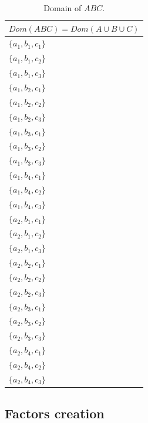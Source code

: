 \begin{table}[]
\centering
\begin{tabular}{|l|}
      $Dom(ABC) = Dom(A \cup B \cup C )$  \\
      \hline
$\lbrace a_1, b_1, c_1  \rbrace$ \\ \hline
$\lbrace a_1, b_1, c_2  \rbrace$ \\ \hline
$\lbrace a_1, b_1, c_3  \rbrace$ \\ \hline
$\lbrace a_1, b_2, c_1  \rbrace$ \\ \hline
$\lbrace a_1, b_2, c_2  \rbrace$ \\ \hline
$\lbrace a_1, b_2, c_3  \rbrace$ \\ \hline
$\lbrace a_1, b_3, c_1  \rbrace$ \\ \hline
$\lbrace a_1, b_3, c_2  \rbrace$ \\ \hline
$\lbrace a_1, b_3, c_3  \rbrace$ \\ \hline
$\lbrace a_1, b_4, c_1  \rbrace$ \\ \hline
$\lbrace a_1, b_4, c_2  \rbrace$ \\ \hline
$\lbrace a_1, b_4, c_3  \rbrace$ \\ \hline
$\lbrace a_2, b_1, c_1  \rbrace$ \\ \hline
$\lbrace a_2, b_1, c_2  \rbrace$ \\ \hline
$\lbrace a_2, b_1, c_3  \rbrace$ \\ \hline
$\lbrace a_2, b_2, c_1  \rbrace$ \\ \hline
$\lbrace a_2, b_2, c_2  \rbrace$ \\ \hline
$\lbrace a_2, b_2, c_3  \rbrace$ \\ \hline
$\lbrace a_2, b_3, c_1  \rbrace$ \\ \hline
$\lbrace a_2, b_3, c_2  \rbrace$ \\ \hline
$\lbrace a_2, b_3, c_3  \rbrace$ \\ \hline
$\lbrace a_2, b_4, c_1  \rbrace$ \\ \hline
$\lbrace a_2, b_4, c_2  \rbrace$ \\ \hline
$\lbrace a_2, b_4, c_3  \rbrace$ \\ \hline
\end{tabular}
\caption{Domain of $ABC$.} 
\label{tab:sampleVar:ABC}
\end{table}

\subsection{Factors creation}

